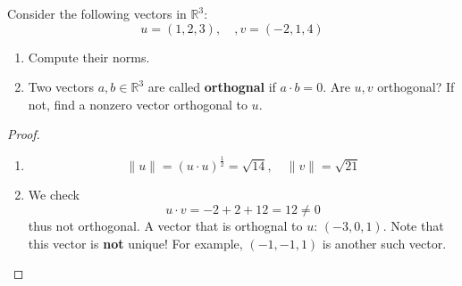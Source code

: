 \documentclass[openany]{book}
\newcommand{\R}{\mathbb{R}}
\begin{document}
\begin{prob}
    Consider the following vectors in $\R^3$:
    \begin{equation*}
        u=(1,2,3), \quad, v=(-2, 1, 4)
    \end{equation*}
    \begin{enumerate}
        \item Compute their norms.
        \item  Two vectors $a,b\in\R^3$ are called \textbf{orthognal} if $a\cdot b=0$. Are $u,v$ orthogonal? If not, find a nonzero vector orthogonal to $u$.
    \end{enumerate}
\end{prob}
\begin{proof}
    \begin{enumerate}
        \item \begin{equation*}
            \|u\|=(u\cdot u)^\frac{1}{2}=\sqrt{14}, \quad \|v\|=\sqrt{21}
        \end{equation*}
        \item We check 
        \begin{equation*}
            u\cdot v=-2+2+12=12\neq 0
        \end{equation*}
        thus not orthogonal. A vector that is orthognal to $u$: $(-3,0,1)$. Note that this vector is \textbf{not} unique! For example, $(-1,-1,1)$ is another such vector.
    \end{enumerate}
\end{proof}

    
    
\end{document}
